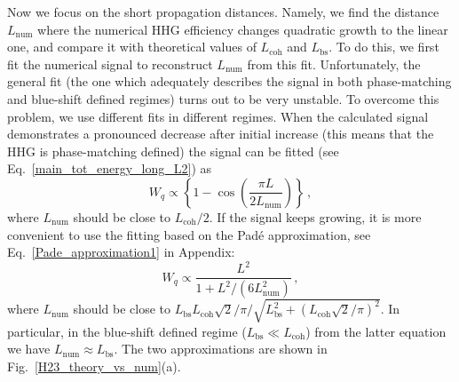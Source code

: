 Now we focus on the short propagation distances. Namely, we find the distance $L_\mathrm{num}$ where the numerical HHG efficiency changes quadratic growth to the linear one, and compare it with theoretical values of $L_\mathrm{coh}$ and $L_\mathrm{bs}$. To do this, we first fit the numerical signal to reconstruct $L_\mathrm{num}$ from this fit. Unfortunately, the general fit (the one which adequately describes the signal in both phase-matching and blue-shift defined regimes) turns out to be very unstable. To overcome this problem, we use different fits in different regimes. When the calculated signal demonstrates a pronounced decrease after initial increase (this means that the HHG is phase-matching defined) the signal can be fitted (see Eq.~\eqref{main_tot_energy_long_L2}) as
\begin{equation}
W_q \propto 
\left\{ 1 - \cos\left(\frac{\pi L}{2 L_\mathrm{num}}\right) \right\} \, ,
    \label{cos_approximation}
\end{equation}
where $L_\mathrm{num}$ should be close to $L_\mathrm{coh}/2$. If the signal keeps growing, it is more convenient to use the fitting based on the Pad\'e approximation, see Eq.~\eqref{Pade_approximation1} in Appendix:
\begin{equation}
W_q \propto 
\frac{L^2}{1+L^2/(6 L_\mathrm{num}^2)} \, ,
\label{Pade_approximation}
\end{equation}
where
$L_\mathrm{num}$ should be close to 
$L_\mathrm{bs} L_\mathrm{coh} \sqrt{2}/\pi/\sqrt{L_\mathrm{bs}^2+\left(L_\mathrm{coh} \sqrt{2}/\pi \right)^2} $. In particular, in the blue-shift defined regime ($L_\mathrm{bs} \ll L_\mathrm{coh}$) from the latter equation we have $L_\mathrm{num}\approx{L_\mathrm{bs}}$. The two approximations are shown in Fig.~\ref{H23_theory_vs_num}(a).

